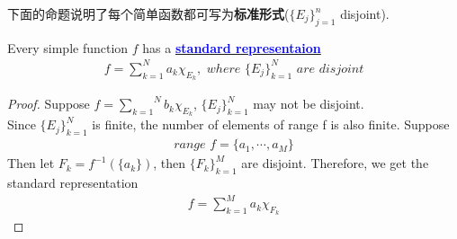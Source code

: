 	\vspace{2em}
	下面的命题说明了每个简单函数都可写为\textbf{标准形式}($\{ E_j \}_{j = 1}^{n}$ disjoint).
	\begin{proposition}
		Every simple function $f$ has a \underline{\textcolor{blue}{\textbf{standard representaion}}}
		\begin{align}
			f = \sum_{k = 1}^{N}{a_k \chi_{E_k}} , \,\, where \,\, \{ E_j \}_{k = 1}^{N} \,\, are \,\, disjoint
		\end{align}
	
		\vspace{2em}
		\begin{proof}
			Suppose $f = \overset{N}{\underset{k = 1}{\sum}}{b_k \chi_{E_k}}$, $\{ E_j \}_{k = 1}^{N}$ may not be disjoint.\\
			Since $\{ E_j \}_{k = 1}^{N}$ is finite, the number of elements of range f is also finite. Suppose
			\begin{align}
				range \,\, f = \{ a_1 , \cdots , a_M \}
			\end{align}
			Then let $F_k = f^{-1}(\{ a_k \})$, then $\{ F_k \}_{k = 1}^{M}$ are disjoint. Therefore, we get the standard representation
			\begin{align}
				f = \sum_{k = 1}^{M}{a_k \chi_{F_k}}
			\end{align}
		\end{proof}
	\end{proposition}

\newpage
